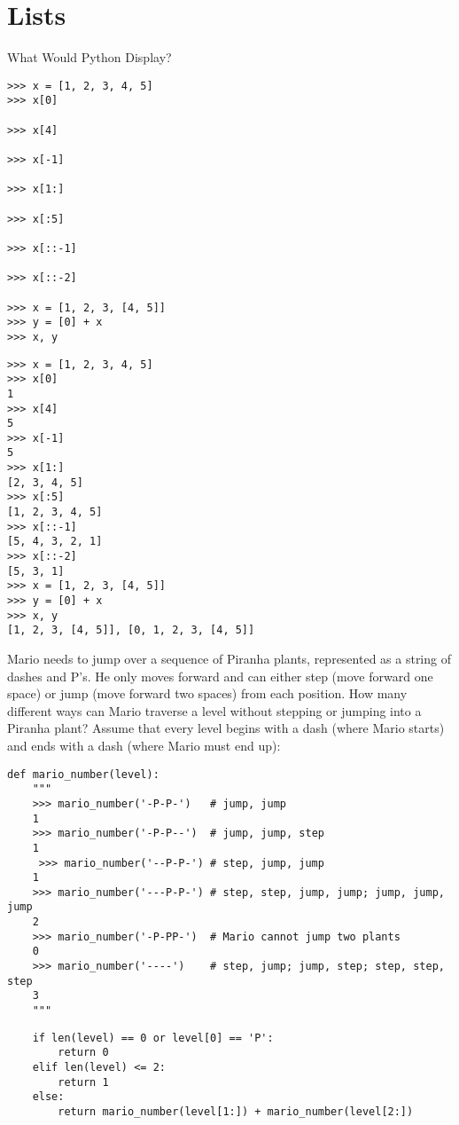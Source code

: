 \documentclass{exam}
\begin{document}
\section{Lists}
\begin{questions}
\question What Would Python Display?

\ifprintanswers\else
\begin{lstlisting}
>>> x = [1, 2, 3, 4, 5]
>>> x[0]

>>> x[4]

>>> x[-1]

>>> x[1:]

>>> x[:5]

>>> x[::-1]

>>> x[::-2]

>>> x = [1, 2, 3, [4, 5]]
>>> y = [0] + x
>>> x, y
\end{lstlisting}
\fi

\begin{solution}
\begin{lstlisting}
>>> x = [1, 2, 3, 4, 5]
>>> x[0]
1
>>> x[4]
5
>>> x[-1] 
5
>>> x[1:]
[2, 3, 4, 5]
>>> x[:5]
[1, 2, 3, 4, 5]
>>> x[::-1]
[5, 4, 3, 2, 1]
>>> x[::-2]
[5, 3, 1]
>>> x = [1, 2, 3, [4, 5]]
>>> y = [0] + x
>>> x, y
[1, 2, 3, [4, 5]], [0, 1, 2, 3, [4, 5]]
\end{lstlisting}
\end{solution}

\clearpage

\question Mario needs to jump over a sequence of Piranha plants, represented as a string of dashes and P's. He only moves forward and can either step (move forward one space) or jump (move forward two spaces) from each position. How many different ways can Mario traverse a level without stepping or jumping into a Piranha plant? Assume that every level begins with a dash (where Mario starts) and ends with a dash (where Mario must end up):

\begin{lstlisting}
def mario_number(level):
    """
    >>> mario_number('-P-P-')   # jump, jump 
    1 
    >>> mario_number('-P-P--')  # jump, jump, step 
    1
     >>> mario_number('--P-P-') # step, jump, jump 
    1   
    >>> mario_number('---P-P-') # step, step, jump, jump; jump, jump, jump 
    2 
    >>> mario_number('-P-PP-')  # Mario cannot jump two plants 
    0 
    >>> mario_number('----')    # step, jump; jump, step; step, step, step
    3
    """
\end{lstlisting}

\begin{solution}
\begin{lstlisting}
    if len(level) == 0 or level[0] == 'P':
        return 0
    elif len(level) <= 2:
        return 1
    else:
        return mario_number(level[1:]) + mario_number(level[2:])
\end{lstlisting}
\end{solution}
\end{questions}
\end{document}
